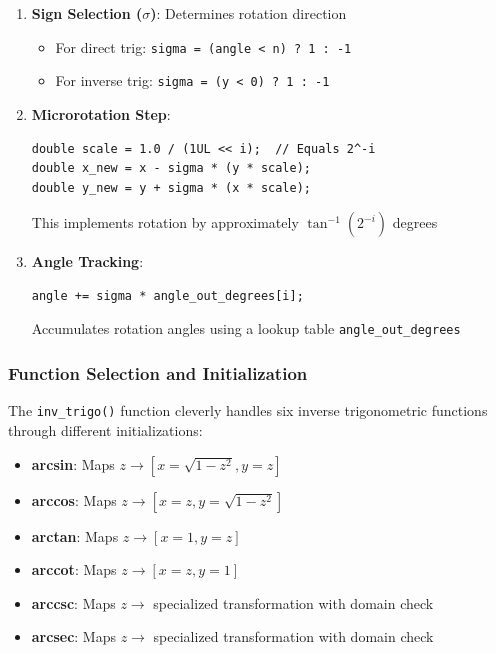 \documentclass[12pt]{article}
\begin{document}
\begin{enumerate}
    \item \textbf{Sign Selection ($\sigma$)}: Determines rotation direction
    \begin{itemize}
        \item For direct trig: \texttt{sigma = (angle < n) ? 1 : -1}
        \item For inverse trig: \texttt{sigma = (y < 0) ? 1 : -1}
    \end{itemize}

    \item \textbf{Microrotation Step}:
    \begin{verbatim}
double scale = 1.0 / (1UL << i);  // Equals 2^-i
double x_new = x - sigma * (y * scale);
double y_new = y + sigma * (x * scale);
    \end{verbatim}
    This implements rotation by approximately $\tan^{-1}(2^{-i})$ degrees

    \item \textbf{Angle Tracking}:
    \begin{verbatim}
angle += sigma * angle_out_degrees[i];
    \end{verbatim}
    Accumulates rotation angles using a lookup table \texttt{angle\_out\_degrees}
\end{enumerate}

\subsubsection{Function Selection and Initialization}

The \texttt{inv\_trigo()} function cleverly handles six inverse trigonometric functions through different initializations:

\begin{itemize}
    \item \textbf{arcsin}: Maps $z \to [x=\sqrt{1-z^2}, y=z]$
    \item \textbf{arccos}: Maps $z \to [x=z, y=\sqrt{1-z^2}]$
    \item \textbf{arctan}: Maps $z \to [x=1, y=z]$
    \item \textbf{arccot}: Maps $z \to [x=z, y=1]$
    \item \textbf{arccsc}: Maps $z \to$ specialized transformation with domain check
    \item \textbf{arcsec}: Maps $z \to$ specialized transformation with domain check
\end{itemize}
\end{document}

